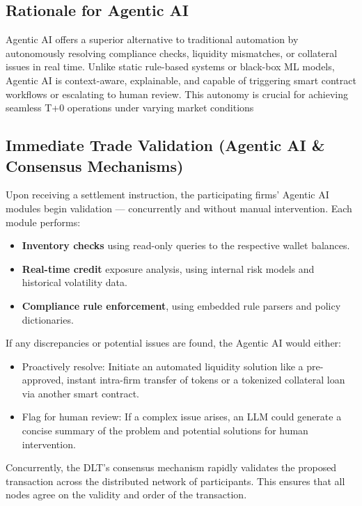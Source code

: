 \documentclass[conference]{IEEEtran}
\begin{document}
\subsection{Rationale for Agentic AI} 
Agentic AI offers a superior alternative to traditional automation by autonomously resolving compliance checks, liquidity mismatches, or collateral issues in real time. Unlike static rule-based systems or black-box ML models, Agentic AI is context-aware, explainable, and capable of triggering smart contract workflows or escalating to human review. This autonomy is crucial for achieving seamless T+0 operations under varying market conditions
\subsection{Immediate Trade Validation (Agentic AI \& Consensus Mechanisms)}
Upon receiving a settlement instruction, the participating firms’ Agentic AI modules begin validation — concurrently and without manual intervention. Each module performs:
\begin{itemize}
    \item \textbf{Inventory checks} using read-only queries to the respective wallet balances.
    \item \textbf{Real-time credit} exposure analysis, using internal risk models and historical volatility data.
    \item \textbf{Compliance rule enforcement}, using embedded rule parsers and policy dictionaries.
\end{itemize}

If any discrepancies or potential issues are found, the Agentic AI would either:
\begin{itemize}
    \item Proactively resolve: Initiate an automated liquidity solution like a pre-approved, instant intra-firm transfer of tokens or a tokenized collateral loan via another smart contract.
    \item Flag for human review: If a complex issue arises, an LLM could generate a concise summary of the problem and potential solutions for human intervention.
\end{itemize}

Concurrently, the DLT's consensus mechanism rapidly validates the proposed transaction across the distributed network of participants. This ensures that all nodes agree on the validity and order of the transaction.
\end{document}
